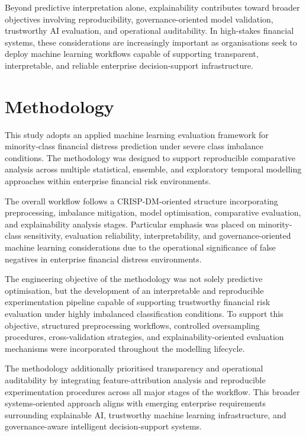 \documentclass{article}
\begin{document}
Beyond predictive interpretation alone, explainability contributes toward broader objectives involving reproducibility, governance-oriented model validation, trustworthy AI evaluation, and operational auditability. In high-stakes financial systems, these considerations are increasingly important as organisations seek to deploy machine learning workflows capable of supporting transparent, interpretable, and reliable enterprise decision-support infrastructure.

\section{Methodology}

This study adopts an applied machine learning evaluation framework for minority-class financial distress prediction under severe class imbalance conditions. The methodology was designed to support reproducible comparative analysis across multiple statistical, ensemble, and exploratory temporal modelling approaches within enterprise financial risk environments.

The overall workflow follows a CRISP-DM-oriented structure incorporating preprocessing, imbalance mitigation, model optimisation, comparative evaluation, and explainability analysis stages. Particular emphasis was placed on minority-class sensitivity, evaluation reliability, interpretability, and governance-oriented machine learning considerations due to the operational significance of false negatives in enterprise financial distress environments.

The engineering objective of the methodology was not solely predictive optimisation, but the development of an interpretable and reproducible experimentation pipeline capable of supporting trustworthy financial risk evaluation under highly imbalanced classification conditions. To support this objective, structured preprocessing workflows, controlled oversampling procedures, cross-validation strategies, and explainability-oriented evaluation mechanisms were incorporated throughout the modelling lifecycle.

The methodology additionally prioritised transparency and operational auditability by integrating feature-attribution analysis and reproducible experimentation procedures across all major stages of the workflow. This broader systems-oriented approach aligns with emerging enterprise requirements surrounding explainable AI, trustworthy machine learning infrastructure, and governance-aware intelligent decision-support systems.
\end{document}
